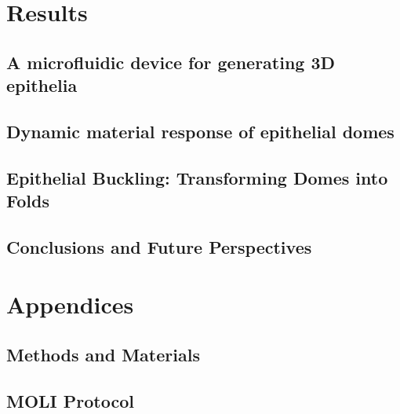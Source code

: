 \documentclass[11pt, final, a4paper, twoside, openright]{book}
\begin{document}
	\part{Results}
	\renewcommand{\thesection}{6.\arabic{section}}
	\hypertarget{a-microfluidic-system-for-generating-3d-epithelia-with-controlled-pressure-and-shape}{%
	\chapter{A microfluidic device for generating 3D epithelia}\label{a-microfluidic-system-for-generating-3d-epithelia-with-controlled-pressure-and-shape}}
	

	\renewcommand{\thesection}{7.\arabic{section}}
	\hypertarget{dynamic-material-response-of-epithelial-domes}{%
	\chapter{Dynamic material response of epithelial
	domes}\label{dynamic-material-response-of-epithelial-domes}}
	

	\renewcommand{\thesection}{8.\arabic{section}}
	\hypertarget{epithelial-buckling-transforming-domes-into-folds}{%
	\chapter{Epithelial Buckling: Transforming Domes into Folds}\label{epithelial-buckling-transforming-domes-into-folds}}
	
	
	\renewcommand{\thesection}{9.\arabic{section}}
	\hypertarget{chapter-9}{%
	\chapter{Conclusions and Future Perspectives}\label{chapter-9}}
	
	


	\part{Appendices}
	\begin{appendices}
		\renewcommand{\thesection}{A.\arabic{section}}
		\chapter{Methods and Materials}   \label{appendix_1}
		


		\renewcommand{\thesection}{B.\arabic{section}}
		\chapter{MOLI Protocol}   \label{appendix_2}
		
	\end{appendices}
	
	\backmatter
	
	
	
	
	
\end{document}
